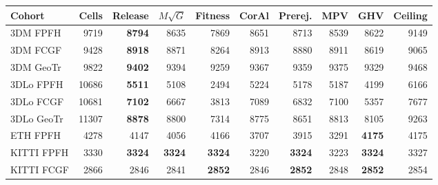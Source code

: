 \footnotesize\setlength{\tabcolsep}{3pt}%
\begin{tabular}{@{}lrrrrrrrrr@{}}
\toprule
Cohort & Cells & Release & $M\sqrt G$ & Fitness & CorAl & Prerej. & MPV & GHV & Ceiling \\
\midrule
3DM FPFH & 9719 & \textbf{8794} & 8635 & 7869 & 8651 & 8713 & 8539 & 8622 & 9149 \\
3DM FCGF & 9428 & \textbf{8918} & 8871 & 8264 & 8913 & 8880 & 8911 & 8619 & 9065 \\
3DM GeoTr & 9822 & \textbf{9402} & 9394 & 9259 & 9367 & 9359 & 9375 & 9329 & 9468 \\
3DLo FPFH & 10686 & \textbf{5511} & 5108 & 2494 & 5224 & 5178 & 5187 & 4199 & 6166 \\
3DLo FCGF & 10681 & \textbf{7102} & 6667 & 3813 & 7089 & 6832 & 7100 & 5357 & 7677 \\
3DLo GeoTr & 11307 & \textbf{8878} & 8800 & 7314 & 8775 & 8651 & 8813 & 8105 & 9263 \\
ETH FPFH & 4278 & 4147 & 4056 & 4166 & 3707 & 3915 & 3291 & \textbf{4175} & 4175 \\
KITTI FPFH & 3330 & \textbf{3324} & \textbf{3324} & \textbf{3324} & 3220 & \textbf{3324} & 3223 & \textbf{3324} & 3327 \\
KITTI FCGF & 2866 & 2846 & 2841 & \textbf{2852} & 2846 & \textbf{2852} & 2848 & \textbf{2852} & 2854 \\
\bottomrule
\end{tabular}%
